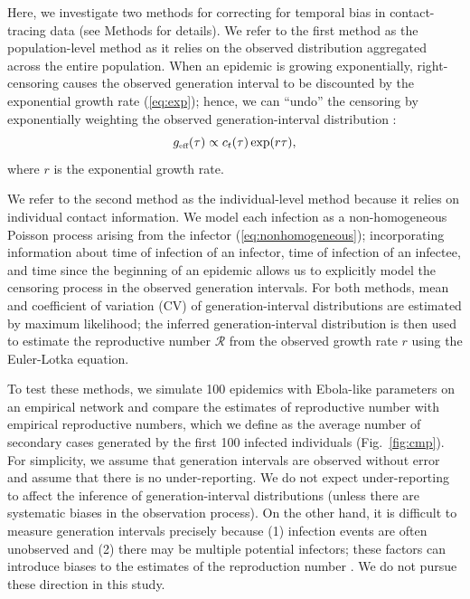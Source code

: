\documentclass[12pt]{article}
\newcommand{\eref}[1]{(\ref{eq:#1})}
\newcommand{\fref}[1]{Fig.~\ref{fig:#1}}
\newcommand{\RR}{\ensuremath{{\mathcal R}}}
\newcommand{\tsub}[2]{#1_{{\textrm{\tiny #2}}}}
\begin{document}
Here, we investigate two methods for correcting for temporal bias in contact-tracing data (see Methods for details).
We refer to the first method as the population-level method as it relies on the observed distribution aggregated across the entire population.
When an epidemic is growing exponentially, right-censoring causes the observed generation interval to be discounted by the exponential growth rate \eref{exp};
hence, we can ``undo'' the censoring by exponentially weighting the observed generation-interval distribution \citep{tomba2010some, nishiura2010time, britton2019estimation}:
\begin{equation}
\tsub{g}{eff}(\tau) \propto c_t(\tau) \exp(r\tau),
\label{eq:geff}
\end{equation}
where $r$ is the exponential growth rate.

We refer to the second method as the individual-level method because it relies on individual contact information.
We model each infection as a non-homogeneous Poisson process arising from the infector \eref{nonhomogeneous}; 
incorporating information about time of infection of an infector, time of infection of an infectee, and time since the beginning of an epidemic allows us to explicitly model the censoring process in the observed generation intervals.
For both methods, mean and coefficient of variation (CV) of generation-interval distributions are estimated by maximum likelihood; the inferred generation-interval distribution is then used to estimate the reproductive number $\RR$ from the observed growth rate $r$ using the Euler-Lotka equation.

To test these methods, we simulate 100 epidemics with Ebola-like parameters on an empirical network \citep{leskovec2016snap}
and compare the estimates of reproductive number with empirical reproductive numbers, which we define as the average number of secondary cases generated by the first 100 infected individuals (\fref{cmp}).
For simplicity, we assume that generation intervals are observed without error and assume that there is no under-reporting. 
We do not expect under-reporting to affect the inference of generation-interval distributions (unless there are systematic biases in the observation process).
On the other hand, it is difficult to measure generation intervals precisely because (1) infection events are often unobserved and (2) there may be multiple potential infectors; these factors can introduce biases to the estimates of the reproduction number \cite{britton2019estimation}.
We do not pursue these direction in this study.
\end{document}
